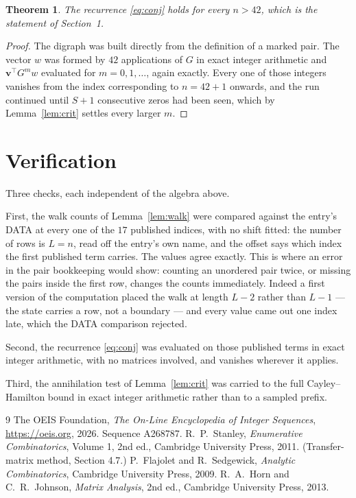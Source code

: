 \documentclass[11pt,a4paper]{article}
\theoremstyle{plain}
\newtheorem{theorem}{Theorem}
\theoremstyle{definition}
\begin{document}
\begin{theorem}
The recurrence \eqref{eq:conj} holds for every $n>42$, which is the statement of
Section~1.
\end{theorem}

\begin{proof}
The digraph was built directly from the definition of a marked pair. The vector $w$ was
formed by $42$ applications of $G$ in exact integer arithmetic and
$\mathbf{v}^{\!\top}G^{m}w$ evaluated for $m=0,1,\dots$, again exactly. Every one of
those integers vanishes from the index corresponding to $n=42+1$ onwards, and the run
continued until $S+1$ consecutive zeros had been seen, which by Lemma~\ref{lem:crit}
settles every larger $m$.
\end{proof}

\section{Verification}

Three checks, each independent of the algebra above.

First, the walk counts of Lemma~\ref{lem:walk} were compared against the entry's DATA at
every one of the $17$ published indices, with no shift fitted: the number of rows is
$L=n$, read off the entry's own name, and the offset says which index the first
published term carries. The values agree exactly. This is where an error in the pair
bookkeeping would show: counting an unordered pair twice, or missing the pairs inside the
first row, changes the counts immediately. Indeed a first version of the computation
placed the walk at length $L-2$ rather than $L-1$ --- the state carries a row, not a
boundary --- and every value came out one index late, which the DATA comparison rejected.

Second, the recurrence \eqref{eq:conj} was evaluated on those published terms in exact
integer arithmetic, with no matrices involved, and vanishes wherever it applies.

Third, the annihilation test of Lemma~\ref{lem:crit} was carried to the full
Cayley--Hamilton bound in exact integer arithmetic rather than to a sampled prefix.

\begin{thebibliography}{9}
 The OEIS Foundation, \emph{The On-Line Encyclopedia of Integer
Sequences}, \url{https://oeis.org}, 2026. Sequence A268787.
 R.~P.~Stanley, \emph{Enumerative Combinatorics}, Volume 1, 2nd ed.,
Cambridge University Press, 2011. (Transfer-matrix method, Section 4.7.)
 P.~Flajolet and R.~Sedgewick, \emph{Analytic Combinatorics}, Cambridge
University Press, 2009.
 R.~A.~Horn and C.~R.~Johnson, \emph{Matrix Analysis}, 2nd ed., Cambridge
University Press, 2013.
\end{thebibliography}
\end{document}
